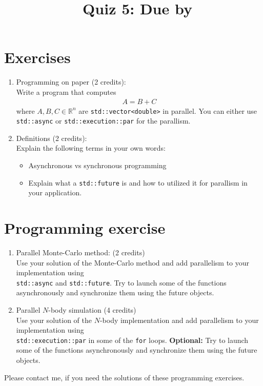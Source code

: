 \documentclass[11pt]{article}
\begin{document}
\title{\coursename~Quiz 5: Due by }
\date{}
\maketitle

\medskip


\section*{Exercises}

\begin{enumerate}
\item Programming on paper (2 credits): \\
Write a program that computes
\begin{align*}
A = B + C
\end{align*}
where $A,B,C \in \mathbb{R}^n$ are \lstinline|std::vector<double>| in parallel. You can either use \lstinline{std::async} or \lstinline{std::execution::par} for the parallism.

\item Definitions (2 credits): \\
Explain the following terms in your own words:
\begin{itemize}
\item Asynchronous vs synchronous programming
\item Explain what a \lstinline|std::future| is and how to utilized it for parallism in your application.
\end{itemize}


\end{enumerate}

\section*{Programming exercise}

\begin{enumerate}

\item Parallel Monte-Carlo method: (2 credits)\\
Use your solution of the Monte-Carlo method and add parallelism to your implementation using \\
\lstinline|std::async| and \lstinline|std::future|. Try to launch some of the functions asynchronously and synchronize them using the future objects. 

\item Parallel $N$-body simulation (4 credits)\\
Use your solution of the $N$-body implementation and add parallelism to your implementation using \\
\lstinline|std::execution::par| in some of the \lstinline|for| loops. \textbf{Optional:} Try to launch some of the functions asynchronously and synchronize them using the future objects. 

\end{enumerate}
Please contact me, if you need the solutions of these programming exercises.
\doclicenseThis 
\end{document}
